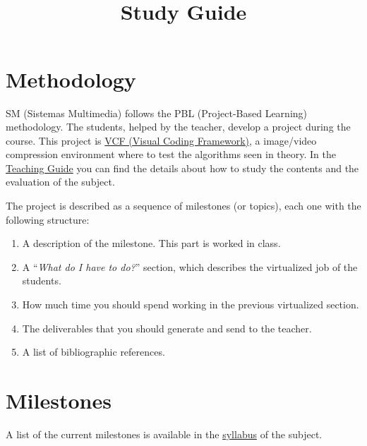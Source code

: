 

\title{\SM{} \\ Study Guide}

\maketitle

\section{Methodology}
SM (Sistemas Multimedia) follows the PBL (Project-Based Learning)
methodology. The students, helped by the teacher, develop a project
during the course. This project is
\href{https://github.com/Sistemas-Multimedia/VCF}{VCF (Visual Coding Framework)}, a image/video
compression environment where to test the algorithms seen in theory. In the
\href{https://www.ual.es/estudios/masteres/presentacion/plandeestudios/asignatura/7114/71142105}{Teaching
  Guide} you can find the details about how to study the contents and
  the evaluation of the subject.

The project is described as a sequence of milestones (or topics), each
one with the following structure:
\begin{enumerate}
\item A description of the milestone. This part is worked in class.
\item A ``\emph{What do I have to do?}'' section, which describes the
  virtualized job of the students.
\item How much time you should spend working in the previous
  virtualized section.
\item The deliverables that you should generate and send to the
  teacher.
\item A list of bibliographic references.
\end{enumerate}

\section{Milestones}
A list of the current milestones is available in the
\href{https://sistemas-multimedia.github.io/syllabus}{syllabus} of the
subject.

